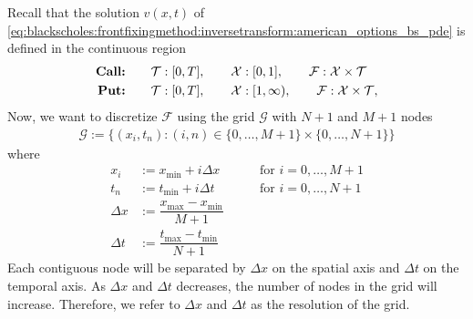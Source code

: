 Recall that the solution $v(x,t)$ of 
\eqref{eq:blackscholes:frontfixingmethod:inversetransform:american_options_bs_pde} is defined in the continuous region 
\begin{subequations}
  \label{eq:finitedifferencesschemes:overview:continous_domain}
\begin{align}
  \text{\textbf{Call:}} \qquad& \mathcal{T}: [0, T], \qquad \mathcal{X}: [0, 1], \qquad  \mathcal{F}: \mathcal{X} \times \mathcal{T} \\
  \text{\textbf{Put:}} \qquad& \mathcal{T}:[0, T], \qquad \mathcal{X}:[1, \infty), \qquad \mathcal{F}: \mathcal{X} \times \mathcal{T},
\end{align}
\end{subequations}
Now, we want to discretize $\mathcal{F}$ using the grid $\mathcal{G}$ with $N+1$ and $M+1$ nodes
\begin{align}
  \label{eq:finitedifferencesschemes:overview:grid}
  \mathcal{G} := \{(x_i, t_n): (i, n) \in \{0,\dots,M+1\}\times\{0,\dots,N+1\}\}
\end{align}
where
\begin{align}
  \label{eq:finitedifferencesschemes:overview:grid_2}
  x_i &:= x_{\text{min}} + i\Delta x &  \qquad \text{for $i = 0,\dots, M+1$} \\
  t_n &:= t_{\text{min}} + i{\Delta t} & \qquad \text{for $i = 0,\dots, N+1$} \\
  \Delta{x} &:= \dfrac{x_{\text{max}} - x_{\text{min}}}{M+1} \\ 
  \Delta{t} &:= \dfrac{t_{\text{max}} - t_{\text{min}}}{N+1}
\end{align}
Each contiguous node will be separated by $\Delta{x}$ on the spatial axis and $\Delta{t}$ on the temporal axis. As $\Delta{x}$ and $\Delta{t}$ decreases, the number of nodes in the grid will increase. Therefore, we refer to $\Delta{x}$ and $\Delta{t}$ as the resolution of the grid.
